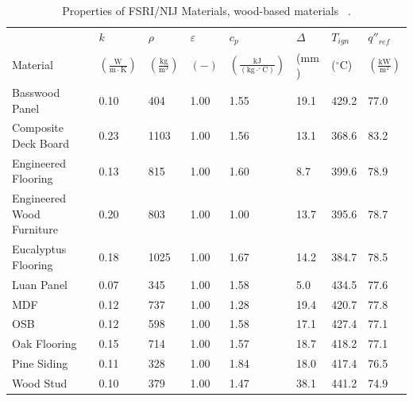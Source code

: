 \clearpage

\begin{table}[!h]
\caption[Properties of FSRI/NIJ Materials, wood-based materials]{Properties of FSRI/NIJ Materials, wood-based materials ~\cite{McKinnon:FSRI2023_Data}.}
\centering
\begin{tabular}{|p{5.5cm}|p{1.0cm}|p{1.0cm}|p{0.8cm}|p{1.4cm}|p{1.0cm}|p{1.0cm}|p{1.2cm}|}
\hline
                                               & $k$    & $\rho$      & $\varepsilon$   & $c_{p}$ & $\Delta$    & $T_{ign}$ & $q''_{ref}$ \\
Material                                       & $\mathrm{\left(\frac{W}{m\cdot K}\right)}$ & $\mathrm{\left(\frac{kg}{m^{3}}\right)}$ & $\mathrm{( - )}$ & $\mathrm{\left(\frac{kJ}{(kg\cdot ^{\circ}C)}\right)}$ &  ($\mathrm{mm}$)   & ($\mathrm{^{\circ}C}$) & $\mathrm{\left(\frac{kW}{m^{2}}\right)}$ \\ \hline
\hline
Basswood Panel & 0.10 & 404 & 1.00 & 1.55 & 19.1 & 429.2 & 77.0 \\ \hline
Composite Deck Board & 0.23 & 1103 & 1.00 & 1.56 & 13.1 & 368.6 & 83.2 \\ \hline
Engineered Flooring & 0.13 & 815 & 1.00 & 1.60 & 8.7 & 399.6 & 78.9 \\ \hline
Engineered Wood Furniture & 0.20 & 803 & 1.00 & 1.00 & 13.7 & 395.6 & 78.7 \\ \hline
Eucalyptus Flooring & 0.18 & 1025 & 1.00 & 1.67 & 14.2 & 384.7 & 78.5 \\ \hline
Luan Panel & 0.07 & 345 & 1.00 & 1.58 & 5.0 & 434.5 & 77.6 \\ \hline
MDF & 0.12 & 737 & 1.00 & 1.28 & 19.4 & 420.7 & 77.8 \\ \hline
OSB & 0.12 & 598 & 1.00 & 1.58 & 17.1 & 427.4 & 77.1 \\ \hline
Oak Flooring & 0.15 & 714 & 1.00 & 1.57 & 18.7 & 418.2 & 77.1 \\ \hline
Pine Siding & 0.11 & 328 & 1.00 & 1.84 & 18.0 & 417.4 & 76.5 \\ \hline
Wood Stud & 0.10 & 379 & 1.00 & 1.47 & 38.1 & 441.2 & 74.9 \\ \hline
\end{tabular}
\label{Properties_FSRI_NIJ_Materials_woods}
\end{table}

